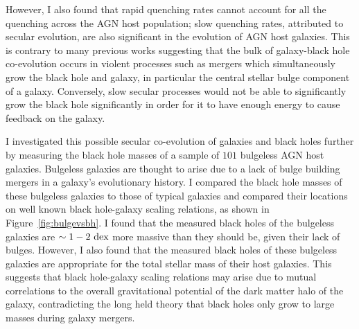 \documentclass[12pt]{article}
\begin{document}
However, I also found that rapid quenching rates cannot account for all the quenching across the AGN host population; slow quenching rates, attributed to secular evolution, are also significant in the evolution of AGN host galaxies. This is contrary to many previous works suggesting that the bulk of galaxy-black hole co-evolution occurs in violent processes such as mergers which simultaneously grow the black hole and galaxy, in particular the central stellar bulge component of a galaxy. Conversely, slow secular processes would not be able to significantly grow the black hole significantly in order for it to have enough energy to cause feedback on the galaxy.

I investigated this possible secular co-evolution of galaxies and black holes further by measuring the black hole masses of a sample of $101$ bulgeless AGN host galaxies. Bulgeless galaxies are thought to arise due to a lack of bulge building mergers in a galaxy's evolutionary history. I compared the black hole masses of these bulgeless galaxies to those of typical galaxies and compared their locations on well known black hole-galaxy scaling relations, as shown in Figure~\ref{fig:bulgevsbh}. I found that the measured black holes of the bulgeless galaxies are $\sim1-2~\rm{dex}$ more massive than they should be, given their lack of bulges. However, I also found that the measured black holes of these bulgeless galaxies are appropriate for the total stellar mass of their host galaxies. This suggests that black hole-galaxy scaling relations may arise due to mutual correlations to the overall gravitational potential of the dark matter halo of the galaxy, contradicting the long held theory that black holes only grow to large masses during galaxy mergers. 
\end{document}
